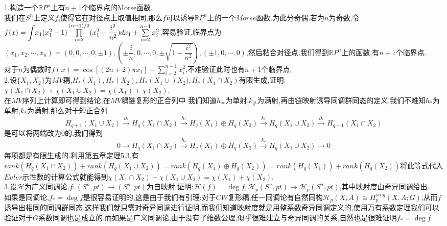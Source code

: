 \documentclass[b5paper]{ctexart}
\begin{document}
\pagestyle{plain}
\noindent
{}
1.构造一个$\mathbb{R}P^n$上有$n+1$个临界点的Morse函数.\\
我们在$S^n$上定义$f$,使得它在对径点上取值相同,那么$f$可以诱导$\mathbb{R}P^n$上的一个$Morse$函数.为此分奇偶.若为$n$为奇数,令$f(x)=\mathlarger{\int} x_1(x_1^2-1)\prod\limits_{i=2}^{(n-1)/2}(x_1^2-\dfrac{i^2}{n^2})dx_1+\sum\limits_{i=2}^{n-1}x_i^2$,容易验证,临界点为
$(x_1,x_2,\cdots,x_n)=(0,0,\cdots,0,\pm 1),(\pm\dfrac{i}{n},0,\cdots,0,\pm \sqrt{1-\dfrac{i^2}{n^2}}),(\pm1,0,\cdots,0)$,然后粘合对径点,我们得到$\mathbb{R}P^n$上的函数,有$n+1$个临界点.\\
对于$n$为偶数时$f(x)=\cos[(2n+2)\pi x_1]+\sum\limits_{i=2}^{n-1}x_i^2$,不难验证此时也有$n+1$个临界点.\\
2.设$\{X_1,X_2\}$为$MV$耦,$H_*(X_1),H_*(X_2),H_*(X_1\cup) X_2),H_*(X_1\cap X_2)$有限生成,证明:$\chi(X_1\cap X_2)+\chi(X_1\cup X_2)=\chi(X_1)+\chi(X_2)$.\\
在$MV$序列上计算即可得到结论,在$MV$耦链复形的正合列中
我们知道$h_{\#}$为单射,$k_{\#}$为满射,再由链映射诱导同调群同态的定义,我们不难知$h_*$为单射,$k_*$为满射.那么对于短正合列
\[H_{q+1}(X_1\cup X_2)\xrightarrow{\partial_*}H_q(X_1\cap X_2)\xrightarrow{h_*}H_q(X_1)\oplus H_q(X_2)\xrightarrow{k_*}H_{q}(X_1\cup X_2)\xrightarrow{\partial_*}H_{q-1}(X_1\cap X_2)
\]
是可以将两端改为$0$的,我们得到
\[0\rightarrow H_q(X_1\cap X_2)\xrightarrow{h_*}H_q(X_1)\oplus H_q(X_2)\xrightarrow{k_*}H_{q}(X_1\cup X_2)\rightarrow 0
\]
每项都是有限生成的.利用第五章定理5.3,有$rank(H_q(X_1\cap X_2))+rank(H_q(X_1\cup X_2))=rank(H_q(X_1)\oplus H_q(X_2))=rank(H_q(X_1))+rank(H_q(X_2))$将此等式代入$Euler$示性数的计算公式就能得到$\chi(X_1\cap X_2)+\chi(X_1\cup X_2)=\chi (X_1)+\chi(X_2).$\\
3.设$\mathscr{H}$为广义同调论,$f:(S^n,pt)\to (S^n,pt)$为自映射.证明:$\mathscr{H}(f)=\deg f,\mathscr{H}_p(S^n,pt)\to \mathscr{H}_p(S^n,pt)$,其中映射度由奇异同调给出.\\
如果是同调论,$f_*=\deg f$是很容易证明的,这是由于我们有引理:对于$CW$复形耦,任一同调论有自然同构$\mathscr{H}_p(X,A)\cong H^{sing}_p(X,A;G)$,从而$f$诱导出相同的同调群同态.这样我们就只需对奇异同调进行证明,而我们知道映射度就是用整系数奇异同调定义的,使用万有系数定理我们可以验证对于$G$系数同调也是成立的.而如果是广义同调论,由于没有了维数公理,似乎很难建立与奇异同调的关系,自然也是很难证明$f_*=\deg f$.
\end{document}
